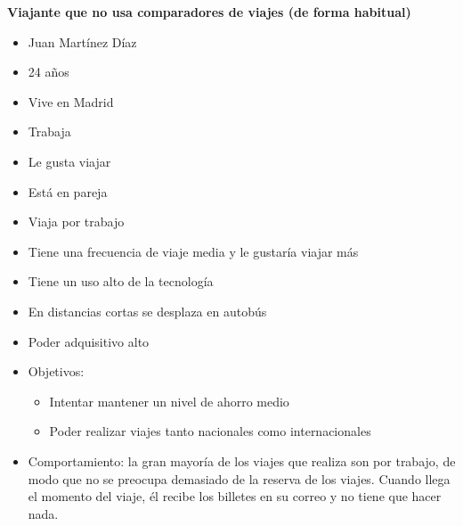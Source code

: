 \noindent \textbf{Viajante que no usa comparadores de viajes (de forma habitual)}
\begin{itemize}
    \item Juan Martínez Díaz
    \item 24 años
    \item Vive en Madrid
    \item Trabaja
    \item Le gusta viajar
    \item Está en pareja
    \item Viaja por trabajo
    \item Tiene una frecuencia de viaje media y le gustaría viajar más
    \item Tiene un uso alto de la tecnología
    \item En distancias cortas se desplaza en autobús
    \item Poder adquisitivo alto
    \item Objetivos:
    \begin{itemize}
        \item Intentar mantener un nivel de ahorro medio
        \item Poder realizar viajes tanto nacionales como internacionales
    \end{itemize}
    \item Comportamiento: la gran mayoría de los viajes que realiza son por trabajo, de modo que no se preocupa demasiado de 
    la reserva de los viajes. Cuando llega el momento del viaje, él recibe los billetes en su correo y no tiene que hacer nada.                      
\end{itemize}

